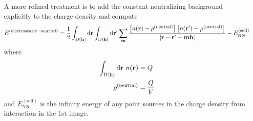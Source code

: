 \documentclass[paper=a4, fontsize=11pt]{article} %
\numberwithin{equation}{section} %
\numberwithin{figure}{section} %
\numberwithin{table}{section} %
\newcommand{\bh}{{\bf{h}}}
\newcommand{\bm}{{\bf{m}}}
\newcommand{\br}{{\bf{r}}}
\newcommand{\rNN}{{\mathrm{NN}}}
\newcommand{\rself}{{\mathrm{self}}}
\newcommand{\rd}{{\mathrm{d}}}
\newcommand{\rD}{{\mathrm{D}}}
\begin{document}
A more refined treatment is to add the constant neutralizing background explicitly to the charge density and compute
\begin{equation}\label{eq:m1}
\begin{split}
E^{(\mathrm{electrostatic-neutral})}
&= \frac{1}{2}\int_{\rD(\bh)} \rd \br \int_{\rD(\bh)}\rd \br'\sum_\bm \frac{\left[n(\br)-\rho^{(\mathrm{neutral})}\right]\left[n(\br')-\rho^{(\mathrm{neutral})}\right]}{|\br-\br'+\bm\bh|} - E_{\rNN}^{(\rself)}\\
\end{split}
\end{equation}
where 
\begin{equation}
\begin{split}
\int_{\rD(\bh)} \rd \br\ n(\br) &= Q \\
\rho^{(\mathrm{neutral})} &= \frac{Q}{V}
\end{split}
\end{equation}
and $E_{\rNN}^{(\rself)}$ is the infinity energy of any point sources in the charge density from interaction in the 1st image.\\
\end{document}
